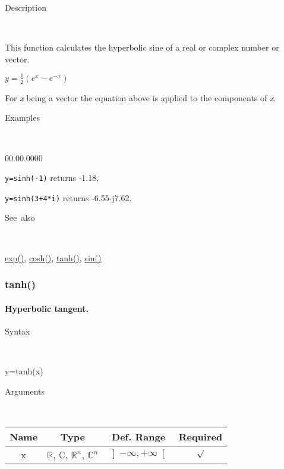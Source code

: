 \begin{description}
\item [Description]~
\end{description}
This function calculates the hyperbolic sine of a real or complex
number or vector.

\medskip{}
$y=\frac{1}{2}\left(e^{x}-e^{-x}\right)$ 
\medskip{}

\noindent For \textit{x} being a vector the equation above is applied
to the components of \textit{x}.

\begin{description}
\item [Examples]~
\end{description}
\begin{lyxlist}{00.00.0000}
\item [\texttt{y=sinh(-1)}]returns -1.18,
\item [\texttt{y=sinh(3+4{*}i)}]returns -6.55-j7.62.
\end{lyxlist}
\begin{description}
\item [See~also]~
\end{description}
\textcolor{blue}{\hyperlink{exp}{exp()}}\textcolor{black}{,} \textcolor{blue}{\hyperlink{cosh}{cosh()}}\textcolor{black}{,}
\textcolor{blue}{\hyperlink{tanh}{tanh()}}\textcolor{black}{,} \textcolor{blue}{\hyperlink{sin}{sin()}}


\newpage
\subsubsection*{\hypertarget{tanh}{}{\Large tanh()}}


\paragraph{\label{par:Hyperbolic-tangent}Hyperbolic tangent.}

\begin{description}
\item [Syntax]~
\end{description}
y=tanh(x)

\begin{description}
\item [Arguments]~
\end{description}
\begin{tabular}{|c|c|c|c|}
\hline 
Name&
Type&
Def. Range&
Required\tabularnewline
\hline
\hline 
x&
$\mathbb{R}$, $\mathbb{C}$, $\mathbb{R}^{n}$, $\mathbb{C}^{n}$&
$\left]-\infty,+\infty\right[$&
$\surd$\tabularnewline
\hline
\end{tabular}

